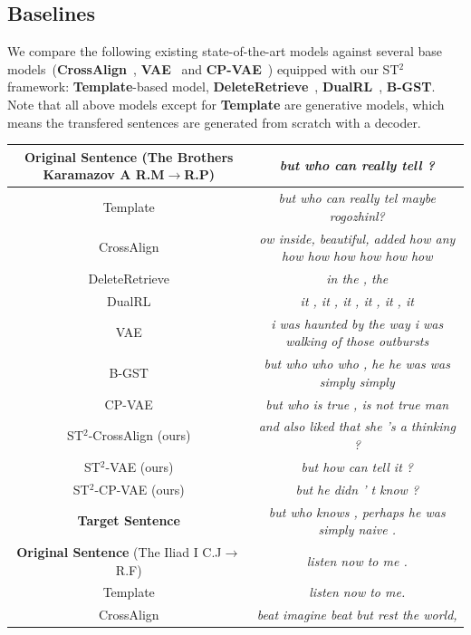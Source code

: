 \subsection{Baselines}
We compare the following existing state-of-the-art models against several base models~(\textbf{CrossAlign}~\citep{shen2017style},  \textbf{VAE}~\citep{john2018disentangled} and \textbf{CP-VAE}~\citep{Xu2019}) equipped with our ST$^2$ framework: \textbf{Template}-based model, \textbf{DeleteRetrieve}~\citep{li2018delete}, \textbf{DualRL}~\citep{luo2019dual}, \textbf{B-GST}\citep{Sudhakar2020}. Note that all above models except for \textbf{Template} are generative models, which means the transfered sentences are generated from scratch with a decoder.
\begin{table}[t!]\footnotesize
	\centering
	\begin{tabular}{c|c}
		\hline
		\textbf{Original Sentence} (The Brothers Karamazov {\color{red}A R.M}$\rightarrow${\color{blue}R.P}) & \emph{but who can really tell ?} \\
		\hline
		Template & \emph{but who can really tel maybe rogozhinl?} \\
		CrossAlign & \emph{ow inside, beautiful, added how any how how how how how how} \\
		DeleteRetrieve & \emph{in the , the} \\
		DualRL & \emph{it , it , it , it , it , it} \\
		VAE & \emph{i was haunted by the way i was walking of those outbursts} \\
		B-GST & \emph{but who who who , he he was was simply simply} \\
		CP-VAE & \emph{but who is true , is not true man} \\
		\hline
		ST$^2$-CrossAlign (ours) & \emph{and also liked that she 's a thinking ?} \\
		ST$^2$-VAE (ours) & \emph{but how can tell it ?} \\
		ST$^2$-CP-VAE (ours) & \emph{ but he didn ’ t know ?} \\
		\hline
		\textbf{Target Sentence} & \emph{but who knows , perhaps he was simply naive .} \\
		\hline
		\hline
		\textbf{Original Sentence} (The Iliad {\color{red}I C.J}$\rightarrow${\color{blue}R.F}) & \emph{listen now to me .} \\
		\hline
		Template & \emph{listen now to me.} \\
		CrossAlign & \emph{beat imagine beat but rest the world,} \\

\end{tabular}
\end{table}
